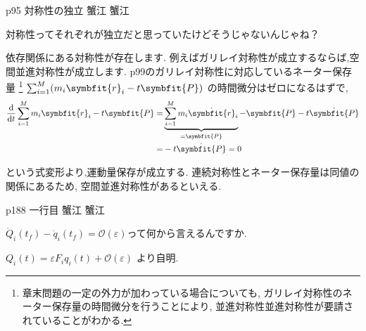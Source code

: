 \documentclass{jlreq}
\newcommand{\qsep}{%
  \tcblower
  \medskip
}
\begin{document}
\begin{qboxok}
  {p95 対称性の独立}
  {蟹江}
  {蟹江}

  対称性ってそれぞれが独立だと思っていたけどそうじゃないんじゃね？

  \qsep

  依存関係にある対称性が存在します.
  例えばガリレイ対称性が成立するならば,空間並進対称性が成立します.
  p99のガリレイ対称性に対応しているネーター保存量
  \footnote{
            章末問題の一定の外力が加わっている場合についても,
            ガリレイ対称性のネーター保存量の時間微分を行うことにより,
            並進対称性並進対称性が要請されていることがわかる.
            }
  \( \sum_{i=1}^{M}( m_i \symbfit{r} _i - t \symbfit{P} ) \) の時間微分はゼロになるはずで,
  \begin{align*}
    \diff**t{\sum_{i=1}^{M} m_i \symbfit{r} _i - t \symbfit{P} }
    =&
    \underbrace{\sum_{i=1}^{M} m_i \dot{\symbfit{r}} _i}_{= \symbfit{P} }   - \symbfit{P} - t \dot{\symbfit{P}} \\
    =&
    -t \dot{\symbfit{P}}=0
  \end{align*}

  という式変形より,運動量保存が成立する.
  連続対称性とネーター保存量は同値の関係にあるため,
  空間並進対称性があるといえる.
\end{qboxok}

\begin{qboxok}
  {p188 一行目 }
  {蟹江}
  {蟹江}

  \( \dot{Q}_i (t_f) - \dot{q}_i (t_f) = 𝒪(ε) \)って何から言えるんですか.

  \qsep

  \( Q_i (t) =  ε F_i q_i (t) +𝒪(ε) \) より自明.

\end{qboxok}
\end{document}
